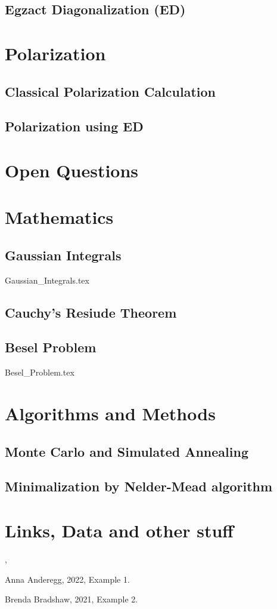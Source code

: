 	\subsection{Egzact Diagonalization (ED)}\blindtext
\section{Polarization}\blindtext
	\subsection{Classical Polarization Calculation}\blindtext
	\subsection{Polarization using ED}\blindtext
\section{Open Questions}\blindtext


\appendix
\section{Mathematics}
		\subsection{Gaussian Integrals}
			{Gaussian_Integrals.tex}
		\subsection{Cauchy's Resiude Theorem}\label{CRT}
		\subsection{Besel Problem}
			{Besel_Problem.tex}
		
\section{Algorithms and Methods}
		\subsection{Monte Carlo and Simulated Annealing}
		\subsection{Minimalization by Nelder-Mead algorithm}

\section{Links, Data and other stuff}	



\cite{aa}, \cite{bb}

\newpage
\begin{thebibliography}{3}

 Anna Anderegg, 2022, Example 1.

 Brenda Bradshaw, 2021, Example 2.

\end{thebibliography}
